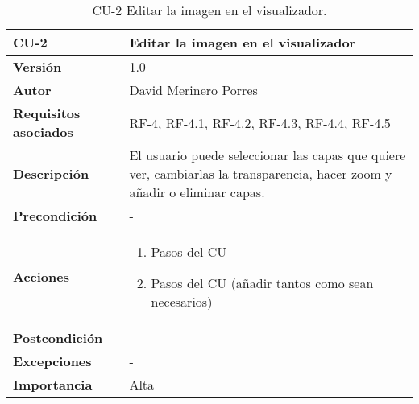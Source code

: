 \begin{table}[p]
	\centering
	\begin{tabularx}{\linewidth}{ p{} p{} }
		\toprule
		\textbf{CU-2}    & \textbf{Editar la imagen en el visualizador}\\
		\toprule
		\textbf{Versión}              & 1.0    \\
		\textbf{Autor}                & David Merinero Porres \\
		\textbf{Requisitos asociados} & RF-4, RF-4.1, RF-4.2, RF-4.3, RF-4.4, RF-4.5 \\
		\textbf{Descripción}          & El usuario puede seleccionar las capas que quiere ver, cambiarlas la transparencia, hacer zoom y añadir o eliminar capas. \\
		\textbf{Precondición}         & - \\
		\textbf{Acciones}             &
		\begin{enumerate}
			\def\labelenumi{\arabic{enumi}.}
			\tightlist
			\item Pasos del CU
			\item Pasos del CU (añadir tantos como sean necesarios)
		\end{enumerate}\\
		\textbf{Postcondición}        & - \\
		\textbf{Excepciones}          & - \\
		\textbf{Importancia}          & Alta \\
		\bottomrule
	\end{tabularx}
	\caption{CU-2 Editar la imagen en el visualizador.}
\end{table}

